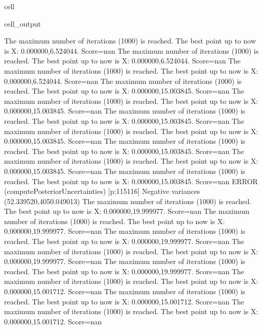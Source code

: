 \documentclass[letterpaper,10pt,english]{jupyterBook}
\begin{document}
\begin{sphinxuseclass}{cell}
\begin{sphinxVerbatimOutput}
\begin{sphinxuseclass}{cell_output}
\begin{sphinxVerbatim}[commandchars=\\\{\}]
The maximum number of iterations (1000) is reached. The best point up to now is X: \PYGZob{}0.000000,\PYGZhy{}6.524044\PYGZcb{}. Score=\PYGZhy{}nan
The maximum number of iterations (1000) is reached. The best point up to now is X: \PYGZob{}0.000000,\PYGZhy{}6.524044\PYGZcb{}. Score=\PYGZhy{}nan
The maximum number of iterations (1000) is reached. The best point up to now is X: \PYGZob{}0.000000,\PYGZhy{}6.524044\PYGZcb{}. Score=\PYGZhy{}nan
The maximum number of iterations (1000) is reached. The best point up to now is X: \PYGZob{}0.000000,15.003845\PYGZcb{}. Score=\PYGZhy{}nan
The maximum number of iterations (1000) is reached. The best point up to now is X: \PYGZob{}0.000000,15.003845\PYGZcb{}. Score=\PYGZhy{}nan
The maximum number of iterations (1000) is reached. The best point up to now is X: \PYGZob{}0.000000,15.003845\PYGZcb{}. Score=\PYGZhy{}nan
The maximum number of iterations (1000) is reached. The best point up to now is X: \PYGZob{}0.000000,15.003845\PYGZcb{}. Score=\PYGZhy{}nan
The maximum number of iterations (1000) is reached. The best point up to now is X: \PYGZob{}0.000000,15.003845\PYGZcb{}. Score=\PYGZhy{}nan
The maximum number of iterations (1000) is reached. The best point up to now is X: \PYGZob{}0.000000,15.003845\PYGZcb{}. Score=\PYGZhy{}nan
The maximum number of iterations (1000) is reached. The best point up to now is X: \PYGZob{}0.000000,15.003845\PYGZcb{}. Score=\PYGZhy{}nan
ERROR (compute\PYGZus{}Posterior\PYGZus{}Uncertainties) [p:115116] Negative variances (\PYGZhy{}52.339520,4050.049013)
The maximum number of iterations (1000) is reached. The best point up to now is X: \PYGZob{}0.000000,19.999977\PYGZcb{}. Score=\PYGZhy{}nan
The maximum number of iterations (1000) is reached. The best point up to now is X: \PYGZob{}0.000000,19.999977\PYGZcb{}. Score=\PYGZhy{}nan
The maximum number of iterations (1000) is reached. The best point up to now is X: \PYGZob{}0.000000,19.999977\PYGZcb{}. Score=\PYGZhy{}nan
The maximum number of iterations (1000) is reached. The best point up to now is X: \PYGZob{}0.000000,19.999977\PYGZcb{}. Score=\PYGZhy{}nan
The maximum number of iterations (1000) is reached. The best point up to now is X: \PYGZob{}0.000000,19.999977\PYGZcb{}. Score=\PYGZhy{}nan
The maximum number of iterations (1000) is reached. The best point up to now is X: \PYGZob{}0.000000,15.001712\PYGZcb{}. Score=\PYGZhy{}nan
The maximum number of iterations (1000) is reached. The best point up to now is X: \PYGZob{}0.000000,15.001712\PYGZcb{}. Score=\PYGZhy{}nan
The maximum number of iterations (1000) is reached. The best point up to now is X: \PYGZob{}0.000000,15.001712\PYGZcb{}. Score=\PYGZhy{}nan

\end{sphinxVerbatim}
\end{sphinxuseclass}
\end{sphinxVerbatimOutput}
\end{sphinxuseclass}
\end{document}
